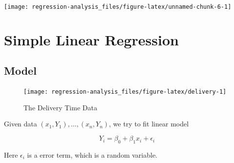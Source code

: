 \documentclass[]{book}
\newenvironment{Shaded}{\begin{snugshade}}{\end{snugshade}}
\newcommand{\DataTypeTok}[1]{\textcolor[rgb]{0.13,0.29,0.53}{#1}}
\newcommand{\FloatTok}[1]{\textcolor[rgb]{0.00,0.00,0.81}{#1}}
\newcommand{\KeywordTok}[1]{\textcolor[rgb]{0.13,0.29,0.53}{\textbf{#1}}}
\newcommand{\NormalTok}[1]{#1}
\newcommand{\OperatorTok}[1]{\textcolor[rgb]{0.81,0.36,0.00}{\textbf{#1}}}
\newcommand{\StringTok}[1]{\textcolor[rgb]{0.31,0.60,0.02}{#1}}
\theoremstyle{definition}
\theoremstyle{definition}
\theoremstyle{definition}
\theoremstyle{remark}
\begin{document}
\begin{center}\texttt{[image: regression-analysis\_files/figure-latex/unnamed-chunk-6-1]} \end{center}

\hypertarget{simple}{%
\chapter{Simple Linear Regression}\label{simple}}

\hypertarget{model}{%
\section{Model}\label{model}}

\begin{Shaded}
\end{Shaded}

\begin{Shaded}
\end{Shaded}

\begin{figure}[H]

{\centering \texttt{[image: regression-analysis\_files/figure-latex/delivery-1]} 

}

\caption{The Delivery Time Data}\label{fig:delivery}
\end{figure}

Given data \((x_1, Y_1), \ldots, (x_n, Y_n)\), we try to fit linear model

\[Y_i = \beta_0 + \beta_1 x_i + \epsilon_i\]

Here \(\epsilon_i\) is a error term, which is a random variable.
\end{document}

